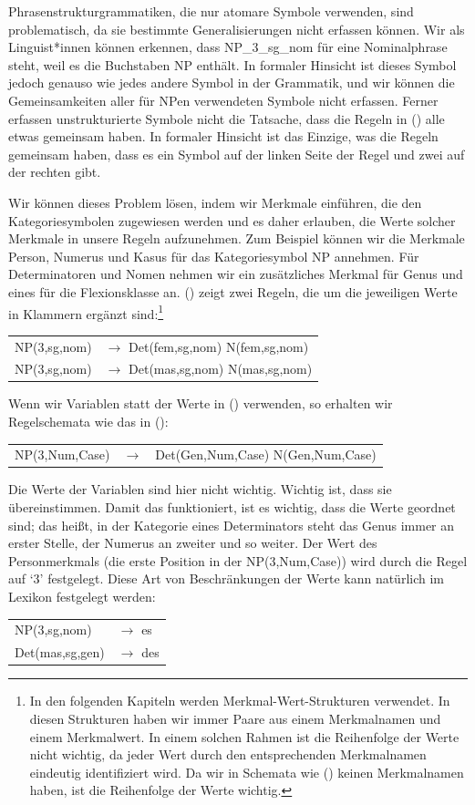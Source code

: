 Phrasenstrukturgrammatiken, die nur atomare Symbole verwenden, sind problematisch, da sie bestimmte Generalisierungen nicht erfassen können.
Wir als Linguist*innen können erkennen, dass NP\_3\_sg\_nom für eine Nominalphrase steht, weil es die Buchstaben NP enthält.
In formaler Hinsicht ist dieses Symbol jedoch genauso wie jedes andere Symbol in der Grammatik, und wir können die Gemeinsamkeiten
aller für NPen verwendeten Symbole nicht erfassen. Ferner erfassen unstrukturierte Symbole nicht die Tatsache, dass die Regeln in ()
alle etwas gemeinsam haben. In formaler Hinsicht ist das Einzige, was die Regeln gemeinsam haben, dass es ein Symbol auf der
linken Seite der Regel und zwei auf der rechten gibt.

Wir können dieses Problem lösen, indem wir Merkmale einführen, die den Kategoriesymbolen zugewiesen werden und es daher erlauben, die Werte
solcher Merkmale in unsere Regeln aufzunehmen. Zum Beispiel können wir die Merkmale Person, Numerus und Kasus für das Kategoriesymbol
NP annehmen. Für Determinatoren und Nomen nehmen wir ein zusätzliches Merkmal für Genus und eines für
die Flexionsklasse an. () zeigt zwei Regeln, die um die jeweiligen Werte in Klammern ergänzt sind:\footnote{%
  In den folgenden Kapiteln werden Merkmal-Wert-Strukturen verwendet. In diesen Strukturen haben wir immer
Paare aus einem Merkmalnamen und einem Merkmalwert. In einem solchen Rahmen ist die Reihenfolge der Werte nicht
wichtig, da jeder Wert durch den entsprechenden Merkmalnamen eindeutig identifiziert wird. Da wir in Schemata wie () keinen Merkmalnamen
haben, ist die Reihenfolge der Werte wichtig.
}

\ea
\begin{tabular}[t]{@{}l@{ }l}
NP(3,sg,nom)  & $\to$ Det(fem,sg,nom) N(fem,sg,nom)\\
NP(3,sg,nom)  & $\to$ Det(mas,sg,nom) N(mas,sg,nom)\\
\end{tabular}
\z
Wenn wir Variablen statt der Werte in () verwenden, so erhalten wir Regelschemata wie das
in ():
\ea
\label{Regel-mit-Variablen}
\begin{tabular}[t]{@{}l@{ }l@{ }l}
NP({3},{Num},{Case}) & $\to$ & Det(Gen,{Num},{Case}) N(Gen,{Num},{Case})\\
\end{tabular}
\z
Die Werte der Variablen sind hier nicht wichtig. Wichtig ist, dass sie übereinstimmen. Damit
das funktioniert, ist es wichtig, dass die Werte geordnet sind; das heißt, in der Kategorie eines Determinators steht das Genus immer an erster Stelle, der Numerus
an zweiter und so weiter. Der Wert des Personmerkmals (die erste Position in der NP(3,Num,Case)) wird durch die Regel auf `3' festgelegt. Diese
Art von Beschränkungen der Werte kann natürlich im Lexikon festgelegt werden:
\ea
\begin{tabular}[t]{@{}l@{ }l}
NP(3,sg,nom)  & $\to$ es\\
Det(mas,sg,gen)  & $\to$ des\\
\end{tabular}
\z

